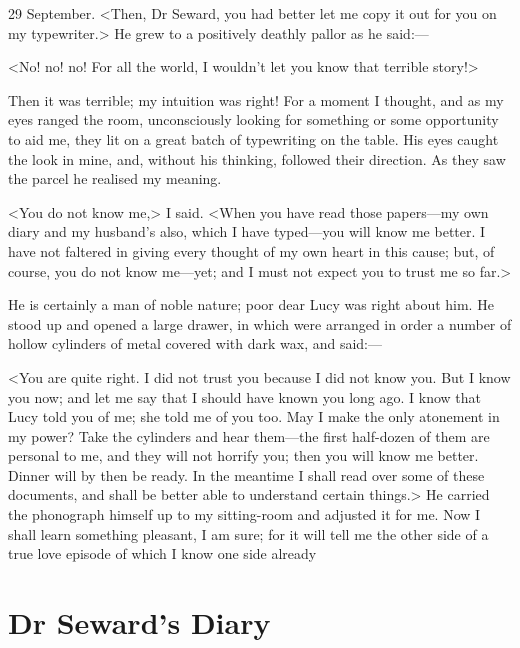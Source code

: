 \begin{diary}{29 September.}
<Then, Dr Seward, you had better let me copy it out for you on my typewriter.> He grew to a positively deathly pallor as he said:—

<No! no! no! For all the world, I wouldn't let you know that terrible story!>

Then it was terrible; my intuition was right! For a moment I thought, and as my eyes ranged the room, unconsciously looking for something or some opportunity to aid me, they lit on a great batch of typewriting on the table. His eyes caught the look in mine, and, without his thinking, followed their direction. As they saw the parcel he realised my meaning.

<You do not know me,> I said. <When you have read those papers—my own diary and my husband's also, which I have typed—you will know me better. I have not faltered in giving every thought of my own heart in this cause; but, of course, you do not know me—yet; and I must not expect you to trust me so far.>

He is certainly a man of noble nature; poor dear Lucy was right about him. He stood up and opened a large drawer, in which were arranged in order a number of hollow cylinders of metal covered with dark wax, and said:—

<You are quite right. I did not trust you because I did not know you. But I know you now; and let me say that I should have known you long ago. I know that Lucy told you of me; she told me of you too. May I make the only atonement in my power? Take the cylinders and hear them—the first half-dozen of them are personal to me, and they will not horrify you; then you will know me better. Dinner will by then be ready. In the meantime I shall read over some of these documents, and shall be better able to understand certain things.> He carried the phonograph himself up to my sitting-room and adjusted it for me. Now I shall learn something pleasant, I am sure; for it will tell me the other side of a true love episode of which I know one side already
\end{diary}

\section{Dr Seward's Diary}
	

